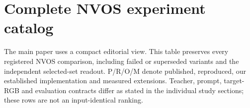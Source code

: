 \documentclass[10pt]{article}
\begin{document}
\clearpage
\section{Complete NVOS experiment catalog}
The main paper uses a compact editorial view. This table preserves every
registered NVOS comparison, including failed or superseded variants and the
independent selected-set readout. P/R/O/M denote published, reproduced, our
established implementation and measured extensions. Teacher, prompt, target-RGB
and evaluation contracts differ as stated in the individual study sections;
these rows are not an input-identical ranking.
\begin{center}\small\end{center}


\end{document}
